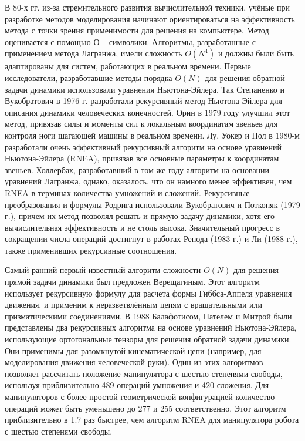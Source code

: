 {	В 80-х гг. из-за стремительного развития вычислительной техники, учёные при разработке методов моделирования начинают ориентироваться на эффективность метода с точки зрения применимости для решения на компьютере.  Метод оценивается с помощью О – символики. Алгоритмы, разработанные с применением метода Лагранжа, имели сложность $O(N^4)$ и должны были быть адаптированы для систем, работающих в реальном времени. Первые исследователи, разработавшие методы порядка $O(N)$ для решения обратной задачи динамики использовали уравнения Ньютона-Эйлера. Так Степаненко и Вукобратович в 1976 г. разработали рекурсивный метод Ньютона-Эйлера для описания динамики человеческих конечностей. Орин в 1979 году улучшил этот метод, привязав силы и моменты сил к локальным координатам звеньев для контроля ноги шагающей машины в реальном времени. Лу, Уокер и Пол в 1980-м разработали очень эффективный рекурсивный алгоритм на основе уравнений Ньютона-Эйлера (RNEA), привязав все основные параметры к координатам звеньев. Холлербах, разработавший в том же году алгоритм на основании уравнений Лагранжа, однако, оказалось, что он намного менее эффективен, чем RNEA в терминах количества умножений и сложений. Рекурсивные преобразования и формулы Родрига использовали Вукобратович и Потконяк \cite{vukobratovic79} (1979 г.), причем их метод позволял решать и прямую задачу динамики, хотя его вычислительная эффективность и не столь высока. Значительный прогресс в сокращении числа операций достигнут в работах Ренода \cite{mahil82} (1983 г.) и Ли \cite{halfman72} (1988 г.), также применивших рекурсивные соотношения.\cite{belousov02}
	
	Самый ранний первый известный алгоритм сложности $O(N)$ для решения прямой задачи динамики был предложен Верещагиным. Этот алгоритм использует рекурсивную формулу для расчета формы Гиббса-Аппеля уравнения движения, и применим к неразветвлённым цепям с вращательными или призматическими соединениями. 
	В 1988 Балафотисом, Пателем и Митрой были представлены два рекурсивных алгоритма на основе уравнений Ньютона-Эйлера, использующие ортогональные тензоры для решения обратной задачи динамики. Они применимы для разомкнутой кинематической цепи (например, для моделирования движения человеческой руки). Один из этих алгоритмов позволяет рассчитать положение манипулятора с шестью степенями свободы, используя приблизительно 489 операций умножения и 420 сложения. Для манипуляторов с более простой геометрической конфигурацией количество операций может быть уменьшено до 277 и 255 соответственно. \cite{balafoutis} Этот алгоритм приблизительно в 1.7 раз быстрее, чем алгоритм RNEA для манипулятора робота с шестью степенями свободы.
	
}
